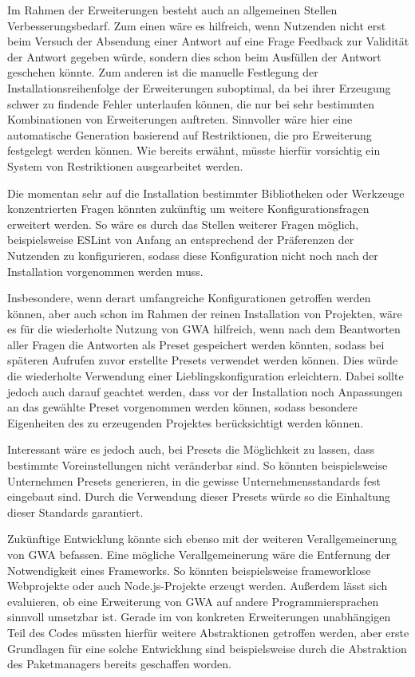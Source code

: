 Im Rahmen der Erweiterungen besteht auch an allgemeinen Stellen Verbesserungsbedarf. Zum einen wäre es hilfreich, wenn Nutzenden nicht erst beim Versuch der Absendung einer Antwort auf eine Frage Feedback zur Validität der Antwort gegeben würde, sondern dies schon beim Ausfüllen der Antwort geschehen könnte. Zum anderen ist die manuelle Festlegung der Installationsreihenfolge der Erweiterungen suboptimal, da bei ihrer Erzeugung schwer zu findende Fehler unterlaufen können, die nur bei sehr bestimmten Kombinationen von Erweiterungen auftreten. Sinnvoller wäre hier eine automatische Generation basierend auf Restriktionen, die pro Erweiterung festgelegt werden können. Wie bereits erwähnt, müsste hierfür vorsichtig ein System von Restriktionen ausgearbeitet werden.

Die momentan sehr auf die Installation bestimmter Bibliotheken oder Werkzeuge konzentrierten Fragen könnten zukünftig um weitere Konfigurationsfragen erweitert werden. So wäre es durch das Stellen weiterer Fragen möglich, beispielsweise ESLint von Anfang an entsprechend der Präferenzen der Nutzenden zu konfigurieren, sodass diese Konfiguration nicht noch nach der Installation vorgenommen werden muss.

Insbesondere, wenn derart umfangreiche Konfigurationen getroffen werden können, aber auch schon im Rahmen der reinen Installation von Projekten, wäre es für die wiederholte Nutzung von \gls{GWA} hilfreich, wenn nach dem Beantworten aller Fragen die Antworten als Preset gespeichert werden könnten, sodass bei späteren Aufrufen zuvor erstellte Presets verwendet werden können. Dies würde die wiederholte Verwendung einer Lieblingskonfiguration erleichtern. Dabei sollte jedoch auch darauf geachtet werden, dass vor der Installation noch Anpassungen an das gewählte Preset vorgenommen werden können, sodass besondere Eigenheiten des zu erzeugenden Projektes berücksichtigt werden können.

Interessant wäre es jedoch auch, bei Presets die Möglichkeit zu lassen, dass bestimmte Voreinstellungen nicht veränderbar sind. So könnten beispielsweise Unternehmen Presets generieren, in die gewisse Unternehmensstandards fest eingebaut sind. Durch die Verwendung dieser Presets würde so die Einhaltung dieser Standards garantiert.

Zukünftige Entwicklung könnte sich ebenso mit der weiteren Verallgemeinerung von \gls{GWA} befassen. Eine mögliche Verallgemeinerung wäre die Entfernung der Notwendigkeit eines Frameworks. So könnten beispielsweise frameworklose Webprojekte oder auch Node.js-Projekte erzeugt werden. Außerdem lässt sich evaluieren, ob eine Erweiterung von \gls{GWA} auf andere Programmiersprachen sinnvoll umsetzbar ist. Gerade im von konkreten Erweiterungen unabhängigen Teil des Codes müssten hierfür weitere Abstraktionen getroffen werden, aber erste Grundlagen für eine solche Entwicklung sind beispielsweise durch die Abstraktion des Paketmanagers bereits geschaffen worden.

